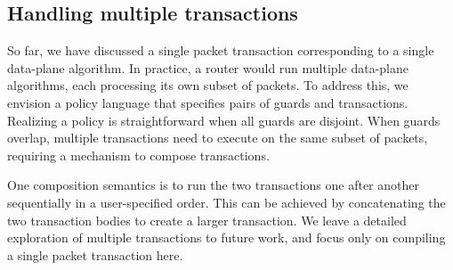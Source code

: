 \subsection{Handling multiple transactions}
\label{ss:multiple}
So far, we have discussed a single packet transaction corresponding to a single
data-plane algorithm. In practice, a router would run multiple data-plane
algorithms, each processing its own subset of packets. To address this, we
envision a policy language that specifies pairs of guards and transactions.
Realizing a policy is straightforward when all guards are disjoint. When guards
overlap, multiple transactions need to execute on the same subset of packets,
requiring a mechanism to compose transactions.

One composition semantics is to run the two transactions one after another
sequentially in a user-specified order. This can be achieved by concatenating
the two transaction bodies to create a larger transaction.  We leave a detailed
exploration of multiple transactions to future work, and focus only on
compiling a single packet transaction here.
